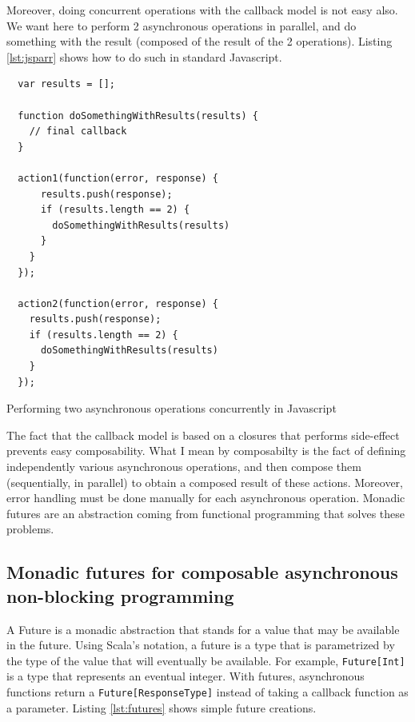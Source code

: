 Moreover, doing concurrent operations with the callback model is not easy also. We want here to perform 2 asynchronous operations in parallel,
and do something with the result (composed of the result of the 2 operations). Listing \ref{lst:jsparr} shows how to do such in standard Javascript.

\begin{listing}[h]
\begin{verbatim}
  var results = [];

  function doSomethingWithResults(results) {
    // final callback
  }

  action1(function(error, response) {
      results.push(response);
      if (results.length == 2) {
        doSomethingWithResults(results)
      }
    }
  });

  action2(function(error, response) {
    results.push(response);
    if (results.length == 2) {
      doSomethingWithResults(results)
    }
  });
\end{verbatim}
\caption{Performing two asynchronous operations concurrently in Javascript}
\label{lst:jsparr}
\end{listing}

The fact that the callback model is based on a closures that performs side-effect prevents easy composability. What I mean by composabilty
is the fact of defining independently various asynchronous operations, and then compose them (sequentially, in parallel) to obtain a composed result
of these actions. Moreover, error handling must be done manually for each asynchronous operation. Monadic futures are an abstraction coming from
functional programming that solves these problems.


\subsection{Monadic futures for composable asynchronous non-blocking programming}

A Future is a monadic abstraction that stands for a value that may be available in the future. Using Scala's notation, a future is a type that is 
parametrized by the type of the value that will eventually be available. For example, \verb|Future[Int]| is a type that represents an eventual integer.
With futures, asynchronous functions return a \verb|Future[ResponseType]| instead of taking a callback function as a parameter. Listing \ref{lst:futures}
shows simple future creations.


